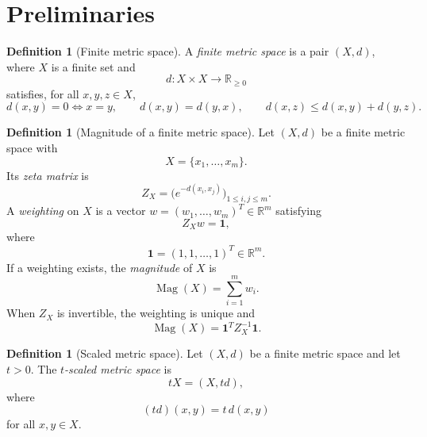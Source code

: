 \documentclass[11pt]{amsart}
\numberwithin{equation}{section}
\theoremstyle{definition}
\newtheorem{definition}[theorem]{Definition}
\theoremstyle{remark}
\DeclareMathOperator{\Mag}{Mag}
\newcommand{\R}{\mathbb{R}}
\newcommand{\one}{\mathbf{1}}
\newcommand{\Zmat}{Z}
\begin{document}
\section{Preliminaries}

\begin{definition}[Finite metric space]\label{def:finite-metric-space}
A \emph{finite metric space} is a pair \((X,d)\), where \(X\) is a finite set and
\begin{equation}\label{eq:metric-axioms}
 d\colon X\times X\longrightarrow \R_{\geq 0}
\end{equation}
 satisfies, for all \(x,y,z\in X\),
\begin{equation}\label{eq:metric-axioms-expanded}
 d(x,y)=0\Longleftrightarrow x=y,\qquad
 d(x,y)=d(y,x),\qquad
 d(x,z)\leq d(x,y)+d(y,z).
\end{equation}
\end{definition}

\begin{definition}[Magnitude of a finite metric space]\label{def:magnitude}
Let \((X,d)\) be a finite metric space with
\begin{equation}\label{eq:ordered-space}
X=\{x_1,\ldots,x_m\}.
\end{equation}
Its \emph{zeta matrix} is
\begin{equation}\label{eq:zeta-matrix}
\Zmat_X=\bigl(e^{-d(x_i,x_j)}\bigr)_{1\leq i,j\leq m}.
\end{equation}
A \emph{weighting} on \(X\) is a vector \(w=(w_1,
\ldots,w_m)^T\in \R^m\) satisfying
\begin{equation}\label{eq:weighting-equation}
\Zmat_X w=\one,
\end{equation}
where
\begin{equation}\label{eq:one-vector}
\one=(1,1,\ldots,1)^T\in \R^m.
\end{equation}
If a weighting exists, the \emph{magnitude} of \(X\) is
\begin{equation}\label{eq:magnitude-definition}
\Mag(X)=\sum_{i=1}^m w_i.
\end{equation}
When \(\Zmat_X\) is invertible, the weighting is unique and
\begin{equation}\label{eq:magnitude-inverse}
\Mag(X)=\one^T\Zmat_X^{-1}\one.
\end{equation}
\end{definition}

\begin{definition}[Scaled metric space]\label{def:scaled-metric-space}
Let \((X,d)\) be a finite metric space and let \(t>0\).  The \emph{\(t\)-scaled metric space} is
\begin{equation}\label{eq:t-scaled-space}
 tX=(X,td),
\end{equation}
where
\begin{equation}\label{eq:t-scaled-distance}
(td)(x,y)=t\,d(x,y)
\end{equation}
for all \(x,y\in X\).
\end{definition}
\end{document}
